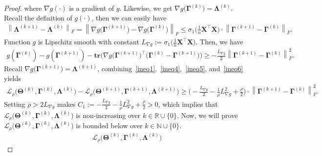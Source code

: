 \documentclass[alpha-refs]{wiley-article}
\begin{document}
\begin{proof}
where $\nabla g (\cdot)$ is a gradient of $g$.
Likewise, we get $\nabla g\big( \boldsymbol{\Gamma}^{(k)} \big) = \boldsymbol{\Lambda}^{(k)}$.
Recall the definition of $g(\cdot)$, then we can easily have
\begin{align} \label{ineq5}
    \left\|\boldsymbol{\Lambda}^{(k+1)}-\boldsymbol{\Lambda}^{(k)}\right\|_{F} =
    \left\|\nabla g\big( \boldsymbol{\Gamma}^{(k+1)} \big)
    - \nabla g\big( \boldsymbol{\Gamma}^{(k)} \big)\right\|_{F}
    \leq \sigma_{1}\bigg( \frac{1}{n}\boldsymbol{X}^{\top}\boldsymbol{X}\bigg)
    \cdot
    \left\| \boldsymbol{\Gamma}^{(k+1)} - \boldsymbol{\Gamma}^{(k)} \right\|_{F}.
\end{align}
Function $g$ is Lipschitz smooth with constant $L_{\nabla g}:=\sigma_{1}\bigg( \frac{1}{n}\boldsymbol{X}^{\top}\boldsymbol{X}\bigg)$.
Then, we have
\begin{align} \label{ineq6}
    g(\boldsymbol{\Gamma}^{(k)}) - g(\boldsymbol{\Gamma}^{(k+1)})
    - \textbf{tr}\bigg(\nabla g\big(\boldsymbol{\Gamma}^{(k+1)}\big)^\top
    \big(\boldsymbol{\Gamma}^{(k)}-\boldsymbol{\Gamma}^{(k+1)}\big)\bigg) \geq -\frac{L_{\nabla g}}{2}
    \left\| \boldsymbol{\Gamma}^{(k+1)} - \boldsymbol{\Gamma}^{(k)} \right\|_{F}^{2}.
\end{align}
Recall $\nabla g\big( \boldsymbol{\Gamma}^{(k+1)} \big) = \boldsymbol{\Lambda}^{(k+1)}$, combining~\eqref{ineq1},~\eqref{ineq4},~\eqref{ineq5}, and~\eqref{ineq6} yields
\begin{align*}
    \mathcal{L}_{\rho} \big( \boldsymbol{\Theta}^{(k)},\boldsymbol{\Gamma}^{(k)},\boldsymbol{\Lambda}^{(k)} \big)
    - \mathcal{L}_{\rho} \big( \boldsymbol{\Theta}^{(k+1)},\boldsymbol{\Gamma}^{(k+1)},\boldsymbol{\Lambda}^{(k+1)} \big)
    \geq \bigg(  -\frac{L_{\nabla g}}{2} -\frac{1}{\rho} L_{\nabla g}^{2} + \frac{\rho}{2} \bigg) \cdot
    \left\| \boldsymbol{\Gamma}^{(k+1)} - \boldsymbol{\Gamma}^{(k)} \right\|_{F}^{2}.
\end{align*}
Setting $\rho>2L_{\nabla g}$ makes $C_{1}:=-\frac{L_{\nabla g}}{2} -\frac{1}{\rho} L_{\nabla g}^{2} + \frac{\rho}{2}>0$, which implies that $\mathcal{L}_{\rho}\big( \boldsymbol{\Theta}^{(k)},\boldsymbol{\Gamma}^{(k)},\boldsymbol{\Lambda}^{(k)} \big)$ is non-increasing over $k\in\mathbb{R}\cup \{0\}$.
Now, we will prove $ \mathcal{L}_{\rho}\big(\boldsymbol{\Theta}^{(k)},\boldsymbol{\Gamma}^{(k)},\boldsymbol{\Lambda}^{(k)}\big)$ is bounded below over $k\in\mathbb{N}\cup\{0\}$.
\begin{align*}
    \mathcal{L}_{\rho}\big(\boldsymbol{\Theta}^{(k)},\boldsymbol{\Gamma}^{(k)},\boldsymbol{\Lambda}^{(k)}\big)

\end{align*}
\end{proof}
\end{document}
